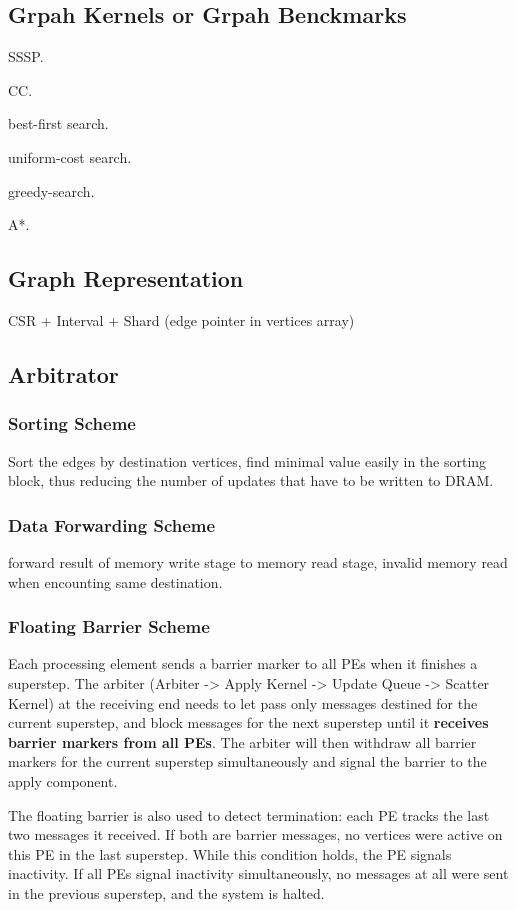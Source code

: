 \documentclass[UTF8,12pt,a4paper]{article}
\begin{document}
\subsection{Grpah Kernels or Grpah Benckmarks}
\begin{compactitem}
  \item SSSP.
  \item CC.
  \item best-first search.
  \item uniform-cost search.
  \item greedy-search.
  \item A*.
\end{compactitem}

\subsection{Graph Representation}
CSR + Interval + Shard (edge pointer in vertices array)~\cite{DBLP:conf/sbac-pad/ZhouP17}

\subsection{Arbitrator} %
\label{sub:arbitrator}
\subsubsection{Sorting Scheme}
Sort the edges by destination vertices, find minimal value easily in the sorting block,
thus reducing the number of updates that have to be written to DRAM.
\subsubsection{Data Forwarding Scheme}
forward result of memory write stage to memory read stage,
invalid memory read when encounting same destination.
\subsubsection{Floating Barrier Scheme}
\label{ssub:floating barrier scheme}
Each processing element sends a barrier marker to
all PEs when it finishes a superstep.
The arbiter (Arbiter -> Apply Kernel -> Update Queue -> Scatter Kernel)
at the receiving end needs to
let pass only messages destined for the current superstep,
and block messages for the next superstep until it \textbf{receives barrier markers from all PEs}.
The arbiter will then withdraw all barrier markers for the current superstep simultaneously
and signal the barrier to the apply component.

The floating barrier is also used to detect termination:
each PE tracks the last two messages it received.
If both are barrier messages, no vertices were active on this PE in the last superstep.
While this condition holds, the PE signals inactivity.
If all PEs signal inactivity simultaneously,
no messages at all were sent in the previous superstep,
and the system is halted.

\clearpage



\newpage
\end{document}
